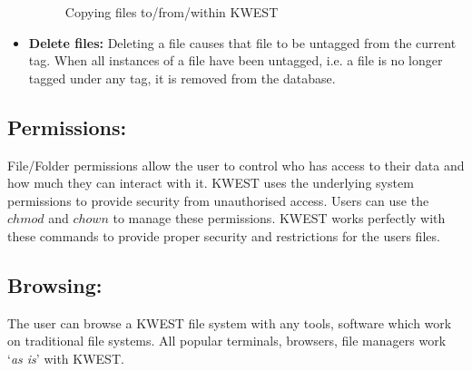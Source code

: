 \begin{itemize}
\begin{figure}[htb]
\caption{Copying files to/from/within KWEST}
\label{fig:dfd0}
\end{figure}
\item \textbf{Delete files:}
Deleting a file causes that file to be untagged from the current tag. When all instances of a file have been untagged, i.e. a file is no longer tagged under any tag, it is removed from the database.
\end{itemize}

\subsection{Permissions:}
File/Folder permissions allow the user to control who has access to their data and how much they can interact with it. KWEST uses the underlying system permissions to provide security from unauthorised access. Users can use the $chmod$ and $chown$ to manage these permissions. KWEST works perfectly with these commands to provide proper security and restrictions for the users files.

\subsection{Browsing:} 
The user can browse a KWEST file system with any tools, software which work on traditional file systems. All popular terminals, browsers, file managers work `\textit{as is}' with KWEST. 


